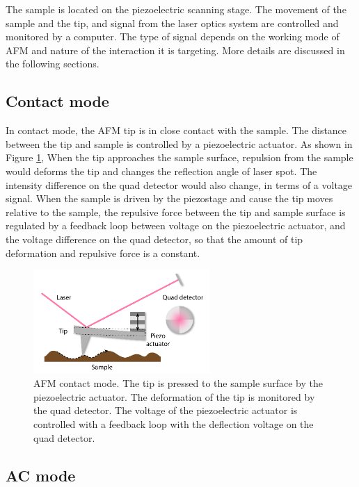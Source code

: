 \documentclass[pdflatex, sectionletters, 12pt]{pittetd}    %
\begin{document}
The sample is located on the piezoelectric scanning stage. The movement of the sample and the tip, and signal from the laser optics system are controlled and monitored by a computer. The type of signal depends on the working mode of AFM and nature of the interaction it is targeting. More details are discussed in the following sections. 

\subsection{Contact mode}

In contact mode, the AFM tip is in close contact with the sample. The distance between the tip and sample is controlled by a piezoelectric actuator. As shown in Figure \ref{FIG:ContactAFM}, When the tip approaches the sample surface, repulsion from the sample would deforms the tip and changes the reflection angle of laser spot. The intensity difference on the quad detector would also change, in terms of a voltage signal. When the sample is driven by the piezostage and cause the tip moves relative to the sample, the repulsive force between the tip and sample surface is regulated by a feedback loop between voltage on the piezoelectric actuator, and the voltage difference on the quad detector, so that the amount of tip deformation and repulsive force is a constant. 

\begin{figure}[h!]
	\centering
	\includegraphics[width=0.6\textwidth]{Drawing/ContactAFM.pdf}
	\caption{AFM contact mode. The tip is pressed to the sample surface by the piezoelectric actuator. The deformation of the tip is monitored by the quad detector. The voltage of the piezoelectric actuator is controlled with a feedback loop with the deflection voltage on the quad detector.}
	\label{FIG:ContactAFM}
\end{figure}


\subsection{AC mode}
\end{document}
